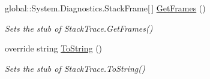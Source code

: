 \begin{DoxyCompactItemize}
global\-::\-System.\-Diagnostics.\-Stack\-Frame\mbox{[}$\,$\mbox{]} \hyperlink{class_system_1_1_diagnostics_1_1_fakes_1_1_stub_stack_trace_a3e6f8794ec296c1c87e47ae2aa06bbd1}{Get\-Frames} ()
\begin{DoxyCompactList}\small\item\em Sets the stub of Stack\-Trace.\-Get\-Frames()\end{DoxyCompactList}\item 
override string \hyperlink{class_system_1_1_diagnostics_1_1_fakes_1_1_stub_stack_trace_a1d8389a9f436cfd7933169861c4046eb}{To\-String} ()
\begin{DoxyCompactList}\small\item\em Sets the stub of Stack\-Trace.\-To\-String()\end{DoxyCompactList}\end{DoxyCompactItemize}
